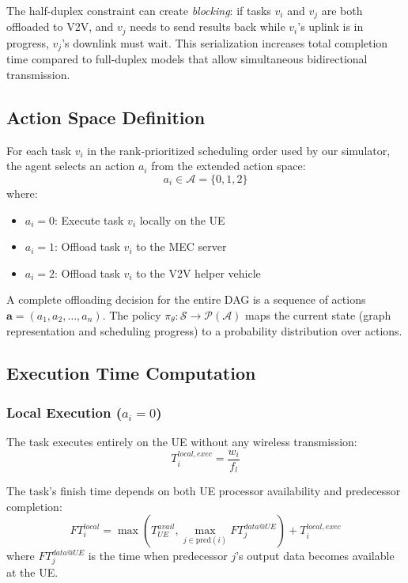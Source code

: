 \documentclass[journal,twoside]{IEEEtran}
\begin{document}
The half-duplex constraint can create \textit{blocking}: if tasks $v_i$ and $v_j$ are both offloaded to V2V, and $v_j$ needs to send results back while $v_i$'s uplink is in progress, $v_j$'s downlink must wait. This serialization increases total completion time compared to full-duplex models that allow simultaneous bidirectional transmission.

\subsection{Action Space Definition}

For each task $v_i$ in the rank-prioritized scheduling order used by our simulator, the agent selects an action $a_i$ from the extended action space:
\begin{equation}
a_i \in \mathcal{A} = \{0, 1, 2\}
\end{equation}
where:
\begin{itemize}
    \item $a_i = 0$: Execute task $v_i$ locally on the UE
    \item $a_i = 1$: Offload task $v_i$ to the MEC server
    \item $a_i = 2$: Offload task $v_i$ to the V2V helper vehicle
\end{itemize}

A complete offloading decision for the entire DAG is a sequence of actions $\mathbf{a} = (a_1, a_2, \ldots, a_n)$. The policy $\pi_\theta: \mathcal{S} \rightarrow \mathcal{P}(\mathcal{A})$ maps the current state (graph representation and scheduling progress) to a probability distribution over actions.

\subsection{Execution Time Computation}

\subsubsection{Local Execution ($a_i = 0$)}
The task executes entirely on the UE without any wireless transmission:
\begin{equation}
T_i^{local,exec} = \frac{w_i}{f_l}
\end{equation}

The task's finish time depends on both UE processor availability and predecessor completion:
\begin{equation}
FT_i^{local} = \max\left( T_{UE}^{avail}, \max_{j \in \text{pred}(i)} FT_j^{data@UE} \right) + T_i^{local,exec}
\end{equation}
where $FT_j^{data@UE}$ is the time when predecessor $j$'s output data becomes available at the UE.
\end{document}
